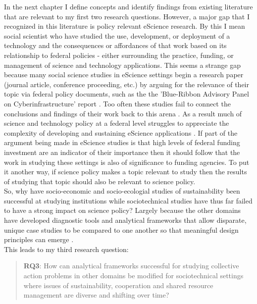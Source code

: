 \documentclass[thesis,tocnosub,noragright,centerchapter,12pt]{uiucecethesis09}
\begin{document}
In the next chapter I define concepts and identify findings from existing literature that are relevant to my first two research questions. However, a major gap that I recognized in this literature is policy relevant eScience research. By this I mean social scientist who have studied the use, development, or deployment of a technology and the consequences or affordances  of that work based on its relationship to federal policies - either surrounding the practice, funding, or management of science and technology applications. This seems a strange gap because many social science studies in eScience settings begin a research paper (journal article, conference proceeding, etc.) by arguing for the relevance of their topic via federal policy documents, such as the the 'Blue-Ribbon Advisory Panel on Cyberinfrastructure' report \citep{atkins2002revol}. Too often these studies fail to connect the conclusions and findings of their work back to this arena \citep{jackson2013cscw}. As a result much of science and technology policy at a federal level struggles to appreciate the complexity of developing and sustaining eScience applications \citep{katzframework}. If part of the argument being made in eScience studies is that  high levels of federal funding investment are an indicator of their importance then it should follow that the work in studying these settings is also of significance to funding agencies. To put it another way, if science policy makes a topic relevant to study then the results of studying that topic should also be relevant to science policy.\\ 

So, why have socio-economic and socio-ecologial studies of sustainability been successful at studying institutions while sociotechnical studies have thus far failed to have a strong impact on science policy? Largely because the other domains have developed diagnostic tools and analytical frameworks that allow disparate, unique case studies to be compared to one another so that meaningful design principles can emerge \citep{ostrom2007diagnostic}.\\

This leads to my third research question:\\

\begin{quote}
\textbf{RQ3}: How can analytical frameworks successful for studying
collective action problems in other domains be modified for
sociotechnical settings where issues of sustainability, cooperation and
shared resource management are diverse and shifting over time?
\end{quote}
\end{document}
